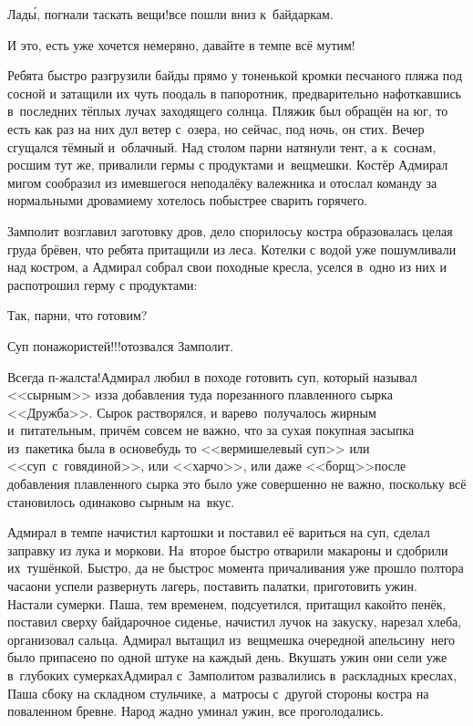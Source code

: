 \diagdash Лад\'{ы}, погнали таскать вещи!\mdash все пошли вниз к~байдаркам.

\diagdash И это, есть уже хочется немеряно, давайте в темпе всё мутим!

Ребята быстро разгрузили байды прямо у тоненькой кромки песчаного пляжа под сосной и затащили их чуть поодаль в папоротник, предварительно нафоткавшись в~последних тёплых лучах заходящего солнца. Пляжик был обращён на юг, то есть как раз на них дул ветер с~озера, но сейчас, под ночь, он стих. Вечер сгущался тёмный и~облачный. Над столом парни натянули тент, а к~соснам, росшим тут же, привалили гермы с продуктами и~вещмешки. Костёр Адмирал мигом сообразил из имевшегося неподалёку валежника и отослал команду за нормальными дровами\mdash ему хотелось побыстрее сварить горячего.

Замполит возглавил заготовку дров, дело спорилось\mdash у костра образовалась целая груда брёвен, что ребята притащили из леса. Котелки с водой уже пошумливали над костром, а Адмирал собрал свои походные кресла, уселся в~одно из них и распотрошил герму с продуктами:

\diagdash Так, парни, что готовим?

\diagdash Суп понажористей!!!\mdash отозвался Замполит.

\diagdash Всегда п-жалста!\mdash Адмирал любил в походе готовить суп, который называл <<сырным>> из\sdash за добавления туда порезанного плавленного сырка <<Дружба>>. Сырок растворялся, и варево~получалось жирным и~питательным, причём совсем не важно, что за сухая покупная засыпка из~пакетика была в основе\mdash будь то <<вермишелевый суп>> или <<суп~с~говядиной>>, или <<харчо>>, или даже <<борщ>>\mdash после добавления плавленного сырка это было уже совершенно не важно, поскольку всё становилось одинаково сырным на~вкус.

Адмирал в темпе начистил картошки и поставил её вариться на суп, сделал заправку из лука и моркови. На~второе быстро отварили макароны и сдобрили их~тушёнкой. Быстро, да не быстро\mdash с момента причаливания уже прошло полтора часа\mdash они успели развернуть лагерь, поставить палатки, приготовить ужин. Настали сумерки. Паша, тем временем, подсуетился, притащил какой\sdash то пенёк, поставил сверху байдарочное сиденье, начистил лучок на закуску, нарезал хлеба, организовал сальца. Адмирал вытащил из~вещмешка очередной апельсин\mdash у~него было припасено по одной штуке на каждый день. Вкушать ужин они сели уже в~глубоких сумерках\mdash Адмирал с~Замполитом развалились в~раскладных креслах, Паша сбоку на складном стульчике, а~матросы с~другой стороны костра на поваленном бревне. Народ жадно уминал ужин, все проголодались.

